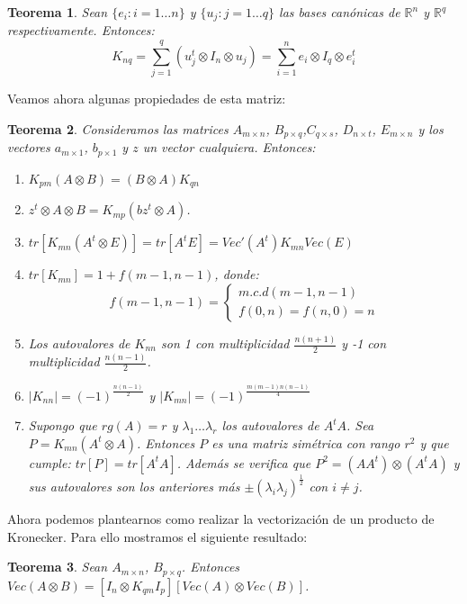 \documentclass{article}
\theoremstyle{theorem-style}  %
\newtheorem{theorem}{Teorema}[section]  %
\theoremstyle{definition-style}
\theoremstyle{example-style}
\theoremstyle{exercise-style}
\begin{document}
\begin{theorem}
	Sean $\{e_i:i=1 \dots n\}$ y $\{u_j:j=1 \dots q\}$ las bases canónicas de $\mathbb{R}^n$ y $\mathbb{R}^q$ respectivamente. Entonces:
		$$ K_{nq}=\sum_{j=1}^{q} (u_j^t \otimes  I_n \otimes u_j) = \sum_{i=1}^{n} e_i \otimes I_q \otimes e_i^t$$
\end{theorem}

Veamos ahora algunas propiedades de esta matriz:

\begin{theorem}
	Consideramos las matrices $A_{m \times n}$, $B_{p \times q}$,$C_{q \times s}$, $D_{n \times t}$, $E_{m \times n}$ y los vectores $a_{m \times 1}$, $b_{p \times 1}$ y $z$ un vector cualquiera. Entonces:
	
	\begin{enumerate}
		\item $K_{pm}(A \otimes B) = (B \otimes A) K_{qn}$
		\item $z^t \otimes A \otimes B = K_{mp}(bz^t \otimes A)$.
		\item $tr[K_{mn}(A^t \otimes E)]=tr[A^tE]= Vec'(A^t)K_{mn}Vec(E)$
		\item $tr[K_{mn}]=1+f(m-1,n-1)$, donde:
		$$f(m-1,n-1) = \begin{cases} m.c.d(m-1, n-1)\\ f(0,n)=f(n,0)=n \end{cases} $$
		\item Los autovalores de $K_{nn}$ son 1 con multiplicidad $\frac{n(n+1)}{2}$ y -1 con multiplicidad $\frac{n(n-1)}{2}$.
		\item $|K_{nn}|= (-1)^{\frac{n(n-1)}{2}}$ y $|K_{mn}|=(-1)^{\frac{m(m-1)n(n-1)}{4}}$
		
		\item Supongo que $rg(A)=r$ y $\lambda_1 \dots \lambda_r$ los autovalores de $A^tA$. Sea $P=K_{mn}(A^t \otimes A)$. Entonces $P$ es una matriz simétrica con rango $r^2$ y que cumple: $tr[P]= tr[A^tA]$. Además se verifica que $P^2=(AA^t)\otimes(A^tA)$ y sus autovalores son los anteriores más $\pm (\lambda_i \lambda_j)^\frac{1}{2}$ con $i \neq j$.
		
	\end{enumerate} 
\end{theorem}

	Ahora podemos plantearnos como realizar la vectorización de un producto de Kronecker. Para ello mostramos el siguiente resultado:
	
	\begin{theorem}
		Sean $A_{m \times n}$, $B_{p \times q}$. Entonces $Vec(A\otimes B)= [I_n \otimes K_{qm} I_p][Vec(A) \otimes Vec(B)]$. 
	\end{theorem}
	
\end{document}
